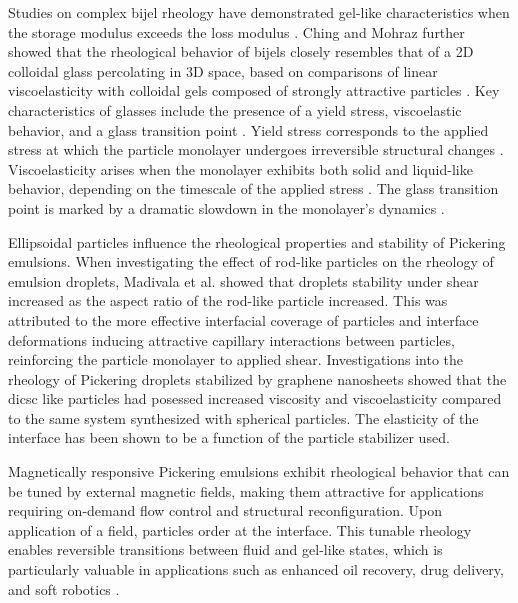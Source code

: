 Studies on complex bijel rheology have demonstrated gel-like characteristics when the storage modulus exceeds the loss modulus \cite{lee_making_2013, bai_dynamics_2015}. 
Ching and Mohraz further showed that the rheological behavior of bijels closely resembles that of a 2D colloidal glass percolating in 3D space, based on comparisons of 
linear viscoelasticity with colloidal gels composed of strongly attractive particles \cite{ching_bijel_2022}. Key characteristics of glasses include the presence of a 
yield stress, viscoelastic behavior, and a glass transition point \cite{pham_yielding_2008, weeks_introduction_2017}. Yield stress corresponds to the applied stress at 
which the particle monolayer undergoes irreversible structural changes \cite{pham_yielding_2008}. Viscoelasticity arises when the monolayer exhibits both solid and 
liquid-like behavior, depending on the timescale of the applied stress \cite{pham_yielding_2008}. The glass transition point is marked by a dramatic slowdown in the 
monolayer's dynamics \cite{weeks_introduction_2017}. 

Ellipsoidal particles influence the rheological properties and stability of Pickering emulsions. When investigating the effect of rod-like particles on the
rheology of emulsion droplets, Madivala et al. showed that droplets stability under shear increased as the aspect ratio of the rod-like particle increased.
\cite{madivala_exploiting_2009} This was attributed to the more effective interfacial coverage of particles and interface deformations inducing attractive
capillary interactions between particles, reinforcing the particle monolayer to applied shear. \cite{madivala_exploiting_2009} Investigations into the rheology of
Pickering droplets stabilized by graphene nanosheets showed that the dicsc like particles had posessed increased viscosity and viscoelasticity compared to the same 
system synthesized with spherical particles. \cite{imperiali_simple_2014} The elasticity of the interface has been shown to be a function of the particle stabilizer
used. \cite{sun_assembly_2013}

Magnetically responsive Pickering emulsions exhibit rheological behavior that can be tuned by external magnetic fields, making them attractive for applications 
requiring on-demand flow control and structural reconfiguration. \cite{qiao_magnetorheological_2012, melle_pickering_2005} Upon application of a field, particles
order at the interface. This tunable rheology enables reversible transitions between fluid and gel-like states, which is particularly valuable in 
applications such as enhanced oil recovery, drug delivery, and soft robotics \cite{tham_magnetophoresis_2021}.


